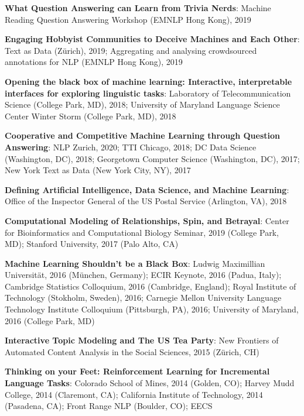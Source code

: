 {{  \begin{enumerate*}
\item {\bf What Question Answering can Learn from Trivia Nerds}:
  Machine Reading Question Answering Workshop (EMNLP Hong Kong), 2019
\item {\bf  Engaging Hobbyist
Communities to Deceive Machines and
Each Other}: Text as Data (Z\"urich), 2019; Aggregating and analysing
crowdsourced annotations for NLP (EMNLP Hong Kong), 2019
\item {\bf Opening the black box of machine learning: Interactive, interpretable interfaces for exploring linguistic tasks}: Laboratory of Telecommunication Science (College Park,
  MD), 2018;  University of Maryland Language Science Center Winter
  Storm (College Park, MD), 2018
\item {\bf Cooperative and Competitive Machine Learning through
    Question Answering}: NLP Zurich, 2020; TTI Chicago, 2018; DC Data Science (Washington, DC), 2018; Georgetown Computer Science (Washington, DC),
  2017; New York Text as Data (New York City, NY), 2017
\item {\bf Defining Artificial Intelligence, Data Science, and Machine
    Learning}: Office of the Inspector General of the US Postal
  Service (Arlington, VA), 2018
\item {\bf Computational Modeling of Relationships, Spin, and
    Betrayal}: Center for Bioinformatics and Computational Biology
  Seminar, 2019 (College Park, MD); Stanford University, 2017 (Palo
  Alto, CA)
\item {\bf Machine Learning Shouldn't be a Black Box}: Ludwig
  Maximillian Universit\"at, 2016 (M\"unchen, Germany); ECIR Keynote,
  2016 (Padua, Italy); Cambridge Statistics Colloquium, 2016
  (Cambridge, England); Royal Institute of Technology (Stokholm,
  Sweden), 2016; Carnegie Mellon University Language Technology
    Institute Colloquium (Pittsburgh, PA), 2016; University of
    Maryland, 2016 (College Park, MD)
	\item {\bf Interactive Topic Modeling and The US Tea Party}:
          New Frontiers of Automated Content Analysis in the Social
          Sciences, 2015 (Z\"urich, CH)
	\item {\bf Thinking on your Feet: Reinforcement Learning for Incremental
Language Tasks}: Colorado School of Mines, 2014 (Golden, CO); Harvey
Mudd College, 2014 (Claremont, CA); California Institute of
Technology, 2014 (Pasadena, CA); Front Range NLP (Boulder, CO); EECS

\end{enumerate*}}}
